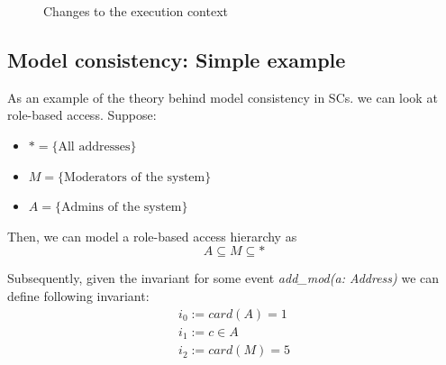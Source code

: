 \documentclass[oneside]{ecsproject}     %
\begin{document}
\begin{figure}[!htb]
  \centering
  \caption{Changes to the execution context}
  \label{Figure:context}
\end{figure}


\newpage
\subsection{Model consistency: Simple example}

As an example of the theory behind model consistency in SCs. we can look at role-based access. Suppose:
\begin{itemize}
  \item $* = \{ \text{All addresses} \}$
  \item $M = \{ \text{Moderators of the system} \}$
  \item $A = \{ \text{Admins of the system} \}$
\end{itemize}

Then, we can model a role-based access hierarchy as 
\[ A \subseteq M \subseteq * \]

Subsequently, given the invariant for some event \textit{add\_mod(a: Address)} we can define following invariant:
\begin{equation*}
    \begin{gathered}
      i_0 := card(A) = 1 \\
      i_1 := c \in A \\
      i_2 := card(M) = 5
    \end{gathered}
  \end{equation*}
\end{document}
